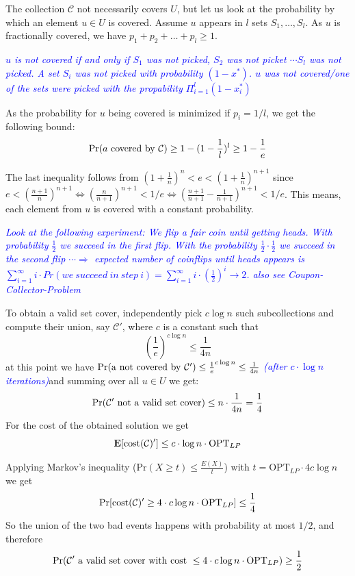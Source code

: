 \documentclass{article}
\begin{document}
The collection $\mathcal{C}$ not necessarily covers $U$, but let us look at the probability by which an element $u\in U$ is covered.
Assume $u$ appears in $l$ sets $S_1, \dots, S_l$. As $u$ is fractionally covered, we have $p_1+p_2+\dots +p_l\geq 1$.

\textcolor{blue}{\emph{$u$ is not covered if and only if $S_1$ was not picked, $S_2$ was not picket $\cdots S_l$ was not picked. A set $S_i$ was not picked with probability $(1-x^*)$. $u$ was not covered/one of the sets were picked with the propability $\Pi_{i=1}^l(1-x_i^*)$}}

As the probability for $u$ being covered is minimized if $p_i=1/l$, we get the following bound:
\[
	{\bf \mathrm{Pr}}(a \mathrm{~ covered~by~ }\mathcal{C}) \geq 1 - (1-\frac{1}{l})^l \geq 1- \frac{1}{e}
\]

The last inequality follows from $(1+\frac{1}{n})^n < e < (1+\frac{1}{n})^{n+1}$ since
$e<(\frac{n+1}{n})^{n+1} \Leftrightarrow (\frac{n}{n+1})^{n+1} < 1/e \Leftrightarrow (\frac{n+1}{n+1}-\frac{1}{n+1})^{n+1}<1/e$.
This means, each element from $u$ is covered with a constant probability.

\textcolor{blue}{\emph{Look at the following experiment: We flip a fair coin until getting heads. With probability $\frac{1}{2}$ we succeed in the first flip. With the probability $\frac{1}{2} \cdot \frac{1}{2}$ we succeed in the second flip $\cdots \Rightarrow$ expected number of coinflips until heads appears is $\sum_{i = 1}^\infty{ i \cdot Pr(we~succeed~in~step~i)} = \sum_{i = 1}^\infty{ i \cdot (\frac{1}{2})^i} \rightarrow 2$. also see Coupon-Collector-Problem}}

To obtain a valid set cover, independently pick $c \log n$ such subcollections and compute their union, say $\mathcal{C}'$, where $c$
is a constant such that
\[
	(\frac{1}{e})^{c\log n }\leq \frac{1}{4n}
\]
at this point we have ${\bf \mathrm{Pr}}(\mathrm{a~not~covered~by~}\mathcal{C}') \leq \frac{1}{e}^{c\log n} \leq \frac{1}{4n}$
\textcolor{blue}{\emph{(after $c\cdot \log n$ iterations)}}and summing over all $u\in U$ we get:
\[
	{\bf \mathrm{Pr}}(\mathcal{C}'\mathrm{~not~a~valid~set~cover}) \leq n\cdot \frac{1}{4n}=\frac{1}{4}
\]
For the cost of the obtained solution we get 
\[
	{\bf E}[\mathrm{cost}(\mathcal{C})']\leq c\cdot \log n\cdot \mathrm{OPT}_{LP}
\]

Applying Markov's inequality ($\mathrm{Pr}(X\geq t)\leq \frac{E(X)}{t}$)
with $t=\mathrm{OPT}_{LP}\cdot 4c \log n$ we get
\[
	{\bf \mathrm{Pr}}[\mathrm{cost}(\mathcal{C})'\geq 4\cdot c \log n \cdot \mathrm{OPT}_{LP}]\leq \frac{1}{4} 
\]
So the union of the two bad events happens with probability at most $1/2$, and therefore 
\[
	{\bf \mathrm{Pr}}(\mathcal{C}'\mathrm{~a~valid~set~cover~with~cost~}\leq 4\cdot c \log n \cdot \mathrm{OPT}_{LP}) 
		\geq \frac{1}{2}
\]
\end{document}

